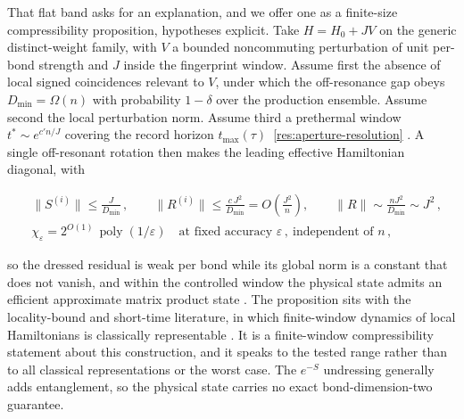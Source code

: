 That flat band asks for an explanation, and we offer one as a finite-size compressibility proposition, hypotheses explicit. Take $H = H_{0} + JV$ on the generic distinct-weight family, with $V$ a bounded noncommuting perturbation of unit per-bond strength and $J$ inside the fingerprint window. Assume first the absence of local signed coincidences relevant to $V$, under which the off-resonance gap obeys $D_{\min} = \Omega(n)$ with probability $1 - \delta$ over the production ensemble. Assume second the local perturbation norm. Assume third a prethermal window $t^{*} \sim e^{c' n / J}$ covering the record horizon $t_{\max}(\tau)$~\eqref{res:aperture-resolution} \cite{abanin2017prethermal}. A single off-resonant rotation then makes the leading effective Hamiltonian diagonal, with
\begin{widetext}
\begin{equation*}
\begin{aligned}
&\lVert S^{(i)}\rVert \le \frac{J}{D_{\min}}\,, \qquad
\lVert R^{(i)}\rVert \le \frac{c\,J^{2}}{D_{\min}} = O\!\left(\frac{J^{2}}{n}\right), \qquad
\lVert R\rVert \sim \frac{n J^{2}}{D_{\min}} \sim J^{2}\,,\\
&\chi_{\varepsilon} = 2^{O(1)}\,\operatorname{poly}(1/\varepsilon) \quad \text{at fixed accuracy } \varepsilon\,, \ \text{independent of } n\,,
\end{aligned}
\end{equation*}
\end{widetext}
so the dressed residual is weak per bond while its global norm is a constant that does not vanish, and within the controlled window the physical state admits an efficient approximate matrix product state \cite{verstraete2008mps}. The proposition sits with the locality-bound and short-time literature, in which finite-window dynamics of local Hamiltonians is classically representable \cite{lieb1972finite, wild2023shorttime}. It is a finite-window compressibility statement about this construction, and it speaks to the tested range rather than to all classical representations or the worst case. The $e^{-S}$ undressing generally adds entanglement, so the physical state carries no exact bond-dimension-two guarantee.

